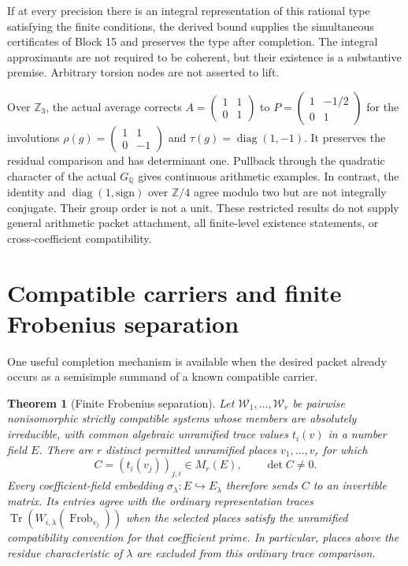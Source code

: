\documentclass[11pt]{article}
\newtheorem{theorem}{Theorem}[section]
\theoremstyle{definition}
\theoremstyle{remark}
\begin{document}
If at every precision there is an integral representation of this rational
type satisfying the finite conditions, the derived bound supplies the
simultaneous certificates of Block 15 and preserves the type after completion.
The integral approximants are not required to be coherent, but their existence
is a substantive premise. Arbitrary torsion nodes are not asserted to lift.

Over $\mathbb Z_3$, the actual average corrects
$A=\left(\begin{smallmatrix}1&1\\0&1\end{smallmatrix}\right)$ to
$P=\left(\begin{smallmatrix}1&-1/2\\0&1\end{smallmatrix}\right)$ for the
involutions $\rho(g)=\left(\begin{smallmatrix}1&1\\0&-1\end{smallmatrix}\right)$
and $\tau(g)=\operatorname{diag}(1,-1)$. It preserves the residual comparison
and has determinant one. Pullback through the quadratic character of the
actual $G_{\mathbb Q}$ gives continuous arithmetic examples. In contrast, the
identity and $\operatorname{diag}(1,\mathrm{sign})$ over $\mathbb Z/4$ agree
modulo two but are not integrally conjugate. Their group order is not a unit.
These restricted results do not supply general arithmetic packet attachment,
all finite-level existence statements, or cross-coefficient compatibility.

\section{Compatible carriers and finite Frobenius separation}

One useful completion mechanism is available when the desired packet already occurs as a semisimple summand of a known compatible carrier.

\begin{theorem}[Finite Frobenius separation]\label{px:9.1}
Let $\mathscr W_1,\ldots,\mathscr W_r$ be pairwise nonisomorphic strictly
compatible systems whose members are absolutely irreducible, with common
algebraic unramified trace values $t_i(v)$ in a number field $E$.
There are $r$ distinct permitted unramified places $v_1,\ldots,v_r$ for which
\[
 C=(t_i(v_j))_{j,i}\in M_r(E),\qquad \det C\ne0.
\]
Every coefficient-field embedding $\sigma_\lambda:E\hookrightarrow E_\lambda$
therefore sends $C$ to an invertible matrix. Its entries agree with the
ordinary representation traces
$\operatorname{Tr}(W_{i,\lambda}(\operatorname{Frob}_{v_j}))$
when the selected places satisfy the unramified compatibility convention
for that coefficient prime. In particular, places above the residue
characteristic of $\lambda$ are excluded from this ordinary trace comparison.
\end{theorem}
\end{document}
